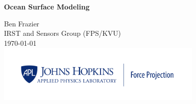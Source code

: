 \titlepage
\begin{center}
\vspace*{50pt}
{\huge \bfseries Ocean Surface Modeling\\}

\vspace{75 pt}

\Large Ben Frazier \\
\large IRST and Sensors Group (FPS/KVU)\\
\vspace{25pt}
\large \today \\
\vspace{150pt}
\includegraphics[width=0.75\textwidth]{../media/FP_Blue.png}

\end{center}

